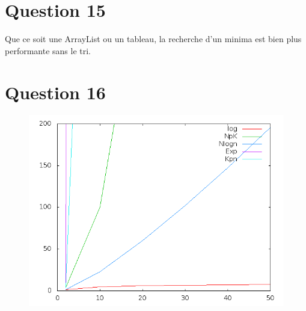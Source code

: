 \documentclass[a4paper,12pt]{report}
\begin{document}
\section*{Question 15}
Que ce soit une ArrayList ou un tableau, la recherche d'un minima est bien plus performante sans le tri.

\newpage

\section*{Question 16}
\begin{figure}[!ht]
	\center
	\includegraphics[scale=0.4]{q16.png}
\end{figure}

\newpage
\end{document}
